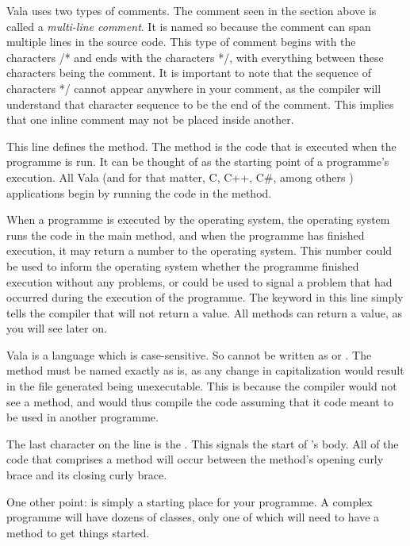 Vala uses two types of comments. The comment seen in the section above is called a \emph{multi-line comment}. It is named so because the comment can span multiple lines in the source code. This type of comment begins with the characters /* and ends with the characters */, with everything between these characters being the comment. It is important to note that the sequence of characters */ cannot appear anywhere in your comment, as the compiler will understand that character sequence to be the end of the comment. This implies that one inline comment may not be placed inside another.


This line defines the  method. The  method is the code that is executed when the programme is run. It can be thought of as the starting point of a programme's execution. All Vala (and for that matter, C, C++, C\#, among others ) applications begin by running the code in the  method.


When a programme is executed by the operating system, the operating system runs the code in the main method, and when the programme has finished execution, it may return a number to the operating system. This number could be used to inform the operating system whether the programme finished execution without any problems, or could be used to signal a problem that had occurred during the execution of the programme. The keyword  in this line simply tells the compiler that  will not return a value. All methods can return a value, as you will see later on.

Vala is a language which is case-sensitive. So  cannot be written as  or . The  method must be named exactly as is, as any change in capitalization would result in the file generated being unexecutable. This is because the compiler would not see a  method, and would thus compile the code assuming that it code meant to be used in another programme.

The last character on the line is the \inlinecode{\{}. This signals the start of ’s body. All of the code that comprises a method will occur between the method’s opening curly brace and its closing curly brace.

One other point:  is simply a starting place for your programme. A complex programme will have dozens of classes, only one of which will need to have a  method to get things started.

